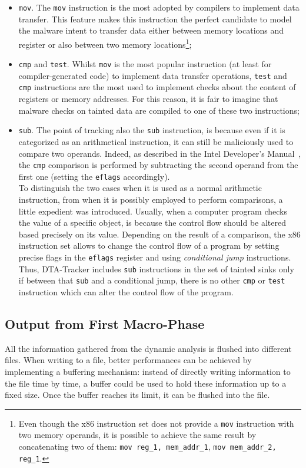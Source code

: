 \documentclass[LaM,binding=0.6cm]{sapthesis}
\begin{document}
\begin{itemize}
\item \texttt{mov}. The \texttt{mov} instruction is the most adopted by compilers to implement data transfer. This feature makes this instruction the perfect candidate to model the malware intent to transfer data either between memory locations and register or also between two memory locations\footnote{Even though the x$86$ instruction set does not provide a \texttt{mov} instruction with two memory operands, it is possible to achieve the same result by concatenating two of them: \texttt{mov reg\_1, mem\_addr\_1}, \texttt{mov mem\_addr\_2, reg\_1}.};
\item \texttt{cmp} and \texttt{test}. Whilst \texttt{mov} is the most popular instruction (at least for compiler-generated code) to implement data transfer operations, \texttt{test} and \texttt{cmp} instructions are the most used to implement checks about the content of registers or memory addresses. For this reason, it is fair to imagine that malware checks on tainted data are compiled to one of these two instructions;
\item \texttt{sub}. The point of tracking also the \texttt{sub} instruction, is because even if it is categorized as an arithmetical instruction, it can still be maliciously used to compare two operands. Indeed, as described in the Intel Developer's Manual~\cite{intel2018intel}, the \texttt{cmp} comparison is performed by subtracting the second operand from the first one (setting the \texttt{eflags} accordingly).\\
To distinguish the two cases when it is used as a normal arithmetic instruction, from when it is possibly employed to perform comparisons, a little expedient was introduced. Usually, when a computer program checks the value of a specific object, is because the control flow should be altered based precisely on its value. Depending on the result of a comparison, the x$86$ instruction set allows to change the control flow of a program by setting precise flags in the \texttt{eflags} register and using \textit{conditional jump} instructions. Thus, {\sf DTA-Tracker} includes \texttt{sub} instructions in the set of tainted sinks only if between that \texttt{sub} and a conditional jump, there is no other \texttt{cmp} or \texttt{test} instruction which can alter the control flow of the program.
\end{itemize}

\subsection{Output from First Macro-Phase}
All the information gathered from the dynamic analysis is flushed into different files. When writing to a file, better performances can be achieved by implementing a buffering mechanism: instead of directly writing information to the file time by time, a buffer could be used to hold these information up to a fixed size. Once the buffer reaches its limit, it can be flushed into the file.
\end{document}
